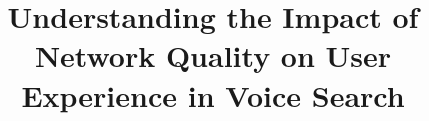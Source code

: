 \documentclass{sig-alternate}
\begin{document}
\title{Understanding the Impact of Network Quality on User Experience in Voice Search}
\author{}

\maketitle










\end{document}
